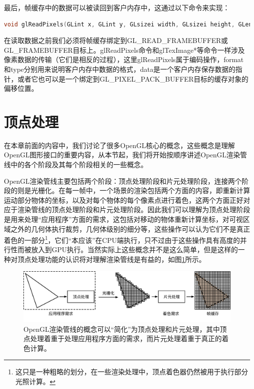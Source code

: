 最后，帧缓存中的数据可以被读回到客户内存中，这通过以下命令来实现：

\begin{lstlisting}[language=C++]
void glReadPixels(GLint x​, GLint y​, GLsizei width​, GLsizei height​, GLenum format​, GLenum type​, GLvoid * data​);
\end{lstlisting}

在读取数据之前我们必须将帧缓存绑定到GL\_READ\_FRAMEBUFFER或 GL\_FRAMEBUFFER目标上。glReadPixels命令和glTexImage*等命令一样涉及像素数据的传输（它们是相反的过程），这里glReadPixels属于编码操作，format和type分别用来说明客户内存中数据的格式，data是一个客户内存保存数据的指针，或者它也可以是一个绑定到GL\_PIXEL\_PACK\_BUFFER目标的缓存对象的偏移位置。






\section{顶点处理}\label{sec:api-vertex-phase}
在本章前面的内容中，我们讨论了很多OpenGL核心的概念，这些概念是理解OpenGL图形接口的重要内容，从本节起，我们将开始按顺序讲述OpenGL渲染管线中的各个阶段及其每个阶段相关的一些概念。

OpenGL渲染管线主要包括两个阶段：顶点处理阶段和片元处理阶段，连接两个阶段的则是光栅化。在每一帧中，一个场景的渲染包括两个方面的内容，即重新计算运动部分物体的坐标，以及对每个物体的每个像素点进行着色，这两个方面正好对应于渲染管线的顶点处理阶段和片元处理阶段。因此我们可以理解为顶点处理阶段是用来处理“应用程序”方面的需求，这包括对移动的物体重新计算坐标，对可视区域之外的几何体执行裁剪，几何体级别的细分等，这些操作可以认为它们不是真正着色的一部分\footnote{这只是一种粗略的划分，在一些渲染处理中，顶点着色器仍然被用于执行部分光照计算。}，它们“本应该”在CPU端执行，只不过由于这些操作具有高度的并行性而被放入到GPU执行。当然实际上这些概念并不是这么简单，但是这样的一种对顶点处理功能的认识将对理解渲染管线是有益的，如图\ref{f:api-vertex-pixel}所示。

\begin{figure}
	\includegraphics[width=\textwidth]{figures/api/vertex-pixel}
	\caption{OpenGL渲染管线的概念可以“简化”为顶点处理和片元处理，其中顶点处理着重于处理应用程序方面的需求，而片元处理着重于真正的着色计算。}
	\label{f:api-vertex-pixel}
\end{figure}



